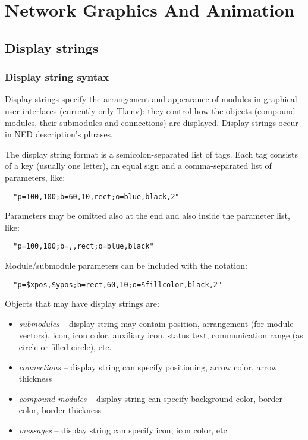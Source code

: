 \chapter{Network Graphics And Animation}
\label{cha:graphics}

\section{Display strings}
\label{sec:ch-graphics:display-strings}

\subsection{Display string syntax}

Display strings specify the arrangement and
appearance of modules in graphical user interfaces (currently only
Tkenv): they control how the objects (compound modules, their
submodules and connections) are displayed. Display strings occur in
NED description's 
phrases.

The display string format is a semicolon-separated list of tags.
Each tag consists of a key (usually one letter), an equal sign
and a comma-separated list of parameters, like:

\begin{verbatim}
  "p=100,100;b=60,10,rect;o=blue,black,2"
\end{verbatim}

Parameters may be omitted also at the end and also inside the
parameter list, like:

\begin{verbatim}
  "p=100,100;b=,,rect;o=blue,black"
\end{verbatim}

Module/submodule parameters can be included with the  notation:

\begin{verbatim}
  "p=$xpos,$ypos;b=rect,60,10;o=$fillcolor,black,2"
\end{verbatim}

Objects that may have display strings are:
\begin{itemize}
  \item \textit{submodules} -- display string may contain position, arrangement
        (for module vectors), icon, icon color, auxiliary icon, status text,
        communication range (as circle or filled circle), etc.
  \item \textit{connections} -- display string can specify positioning, arrow color,
        arrow thickness
  \item \textit{compound modules} -- display string can specify background color,
        border color, border thickness
  \item \textit{messages} -- display string can specify icon, icon color, etc.
\end{itemize}

